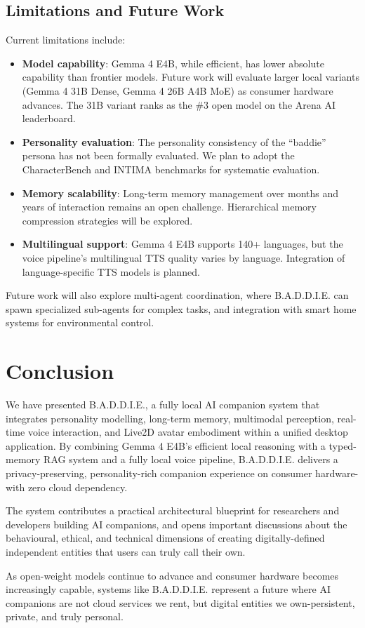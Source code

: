 \documentclass[sigconf]{acmart}
\begin{document}
\subsection{Limitations and Future Work}

Current limitations include:

\begin{itemize}
    \item \textbf{Model capability}: Gemma 4 E4B, while efficient, has lower absolute capability than frontier models. Future work will evaluate larger local variants (Gemma 4 31B Dense, Gemma 4 26B A4B MoE) as consumer hardware advances. The 31B variant ranks as the \#3 open model on the Arena AI leaderboard.
    \item \textbf{Personality evaluation}: The personality consistency of the ``baddie'' persona has not been formally evaluated. We plan to adopt the CharacterBench \cite{arxiv2403.08888} and INTIMA \cite{arxiv2508.09998} benchmarks for systematic evaluation.
    \item \textbf{Memory scalability}: Long-term memory management over months and years of interaction remains an open challenge. Hierarchical memory compression strategies \cite{arxiv2602.02007} will be explored.
    \item \textbf{Multilingual support}: Gemma 4 E4B supports 140+ languages, but the voice pipeline's multilingual TTS quality varies by language. Integration of language-specific TTS models is planned.
\end{itemize}

Future work will also explore multi-agent coordination, where B.A.D.D.I.E. can spawn specialized sub-agents for complex tasks, and integration with smart home systems for environmental control.

\section{Conclusion}

We have presented B.A.D.D.I.E., a fully local AI companion system that integrates personality modelling, long-term memory, multimodal perception, real-time voice interaction, and Live2D avatar embodiment within a unified desktop application. By combining Gemma 4 E4B's efficient local reasoning with a typed-memory RAG system and a fully local voice pipeline, B.A.D.D.I.E. delivers a privacy-preserving, personality-rich companion experience on consumer hardware-with zero cloud dependency.

The system contributes a practical architectural blueprint for researchers and developers building AI companions, and opens important discussions about the behavioural, ethical, and technical dimensions of creating digitally-defined independent entities that users can truly call their own.

As open-weight models continue to advance and consumer hardware becomes increasingly capable, systems like B.A.D.D.I.E. represent a future where AI companions are not cloud services we rent, but digital entities we own-persistent, private, and truly personal.



\end{document}

